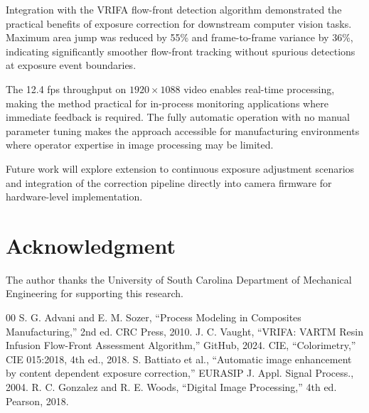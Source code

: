 \documentclass[conference]{IEEEtran}
\begin{document}
Integration with the VRIFA flow-front detection algorithm demonstrated the practical benefits of exposure correction for downstream computer vision tasks. Maximum area jump was reduced by 55\% and frame-to-frame variance by 36\%, indicating significantly smoother flow-front tracking without spurious detections at exposure event boundaries.

The 12.4 fps throughput on $1920 \times 1088$ video enables real-time processing, making the method practical for in-process monitoring applications where immediate feedback is required. The fully automatic operation with no manual parameter tuning makes the approach accessible for manufacturing environments where operator expertise in image processing may be limited.

Future work will explore extension to continuous exposure adjustment scenarios and integration of the correction pipeline directly into camera firmware for hardware-level implementation.

\section*{Acknowledgment}

The author thanks the University of South Carolina Department of Mechanical Engineering for supporting this research.

\begin{thebibliography}{00}
 S. G. Advani and E. M. Sozer, ``Process Modeling in Composites Manufacturing,'' 2nd ed. CRC Press, 2010.
 J. C. Vaught, ``VRIFA: VARTM Resin Infusion Flow-Front Assessment Algorithm,'' GitHub, 2024.
 CIE, ``Colorimetry,'' CIE 015:2018, 4th ed., 2018.
 S. Battiato et al., ``Automatic image enhancement by content dependent exposure correction,'' EURASIP J. Appl. Signal Process., 2004.
 R. C. Gonzalez and R. E. Woods, ``Digital Image Processing,'' 4th ed. Pearson, 2018.
\end{thebibliography}
\end{document}
